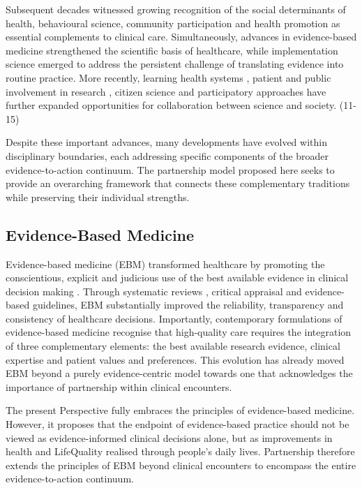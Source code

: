 \documentclass{article}
\begin{document}
Subsequent decades witnessed growing recognition of the social determinants of health, behavioural science, community participation and health promotion as essential complements to clinical care. \cite{Marmot2012} \cite{Nutbeam2000} \cite{Bandura2004} Simultaneously, advances in evidence-based medicine \cite{Sackett1996} \cite{Guyatt2015} strengthened the scientific basis of healthcare, while implementation science \cite{Eccles2006} \cite{Nilsen2015} \cite{Straus2013} emerged to address the persistent challenge of translating evidence into routine practice. More recently, learning health systems \cite{IOM2013}, patient and public involvement in research \cite{Greenhalgh2016} \cite{Cargo2008}, citizen science and participatory approaches have further expanded opportunities for collaboration between science and society. (11-15)

Despite these important advances, many developments have evolved within disciplinary boundaries, each addressing specific components of the broader evidence-to-action continuum. The partnership model proposed here seeks to provide an overarching framework that connects these complementary traditions while preserving their individual strengths.
\subsection{Evidence-Based Medicine}
\label{sec:orgc1c5f70}

Evidence-based medicine (EBM) transformed healthcare by promoting the conscientious, explicit and judicious use of the best available evidence in clinical decision making \cite{Sackett1996}. Through systematic reviews \cite{Guyatt2015}, critical appraisal and evidence-based guidelines, EBM substantially improved the reliability, transparency and consistency of healthcare decisions. Importantly, contemporary formulations of evidence-based medicine recognise that high-quality care requires the integration of three complementary elements: the best available research evidence, clinical expertise and patient values \cite{Guyatt2015} and preferences. This evolution has already moved EBM beyond a purely evidence-centric model towards one that acknowledges the importance of partnership within clinical encounters.

The present Perspective fully embraces the principles of evidence-based medicine. However, it proposes that the endpoint of evidence-based practice should not be viewed as evidence-informed clinical decisions alone, but as improvements in health and LifeQuality realised through people's daily lives. Partnership therefore extends the principles of EBM beyond clinical encounters to encompass the entire evidence-to-action continuum.
\end{document}
